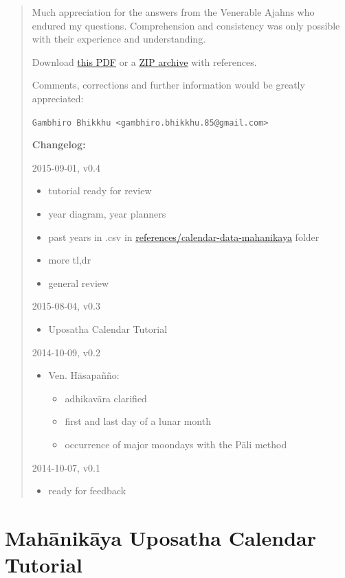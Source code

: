 \documentclass[11pt,oneside]{memoir-article}
\begin{document}
\begin{quote}
Much appreciation for the answers from the Venerable Ajahns who
endured my questions. Comprehension and consistency was only possible
with their experience and understanding.

Download \href{https://github.com/profound-labs/calculating-the-uposatha-moondays/raw/master/calculating-the-uposatha-moondays.pdf}{this PDF} or a \href{https://github.com/profound-labs/calculating-the-uposatha-moondays/archive/master.zip}{ZIP archive} with references.

Comments, corrections and further information would be greatly
appreciated:

\texttt{Gambhiro Bhikkhu <gambhiro.bhikkhu.85@gmail.com>}

\textbf{Changelog:}

2015-09-01, v0.4
\begin{itemize}
\item tutorial ready for review
\item year diagram, year planners
\item past years in .csv in \href{https://github.com/profound-labs/calculating-the-uposatha-moondays/tree/master/references/calendar-data-mahanikaya}{references/calendar-data-mahanikaya} folder
\item more tl,dr
\item general review
\end{itemize}
2015-08-04, v0.3
\begin{itemize}
\item Uposatha Calendar Tutorial
\end{itemize}
2014-10-09, v0.2
\begin{itemize}
\item Ven. Hāsapañño:
\begin{itemize}
\item adhikavāra clarified
\item first and last day of a lunar month
\item occurrence of major moondays with the Pāli method
\end{itemize}
\end{itemize}
2014-10-07, v0.1
\begin{itemize}
\item ready for feedback
\end{itemize}
\end{quote}


\clearpage

\chapter{Mahānikāya Uposatha Calendar Tutorial}
\label{sec-1}
\end{document}
